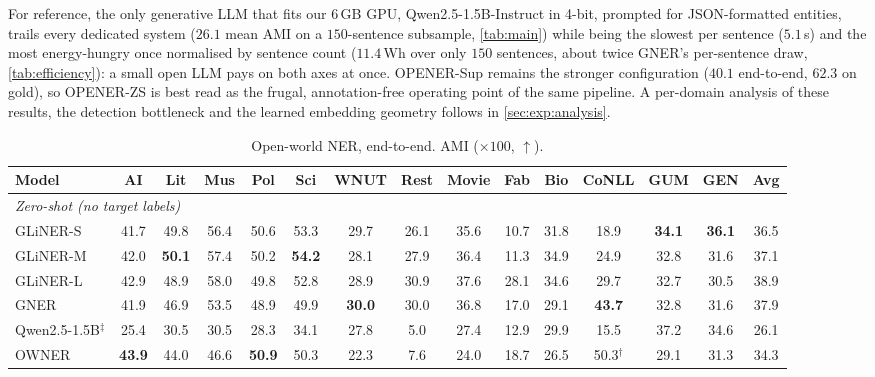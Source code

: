 For reference, the only generative LLM that fits our $6$\,GB GPU, Qwen2.5-1.5B-Instruct \cite{qwen2025} in 4-bit, prompted for JSON-formatted entities, trails every dedicated system ($26.1$ mean AMI on a $150$-sentence subsample, \autoref{tab:main}) while being the slowest per sentence ($5.1$\,s) and the most energy-hungry once normalised by sentence count ($11.4$\,Wh over only $150$ sentences, about twice GNER's per-sentence draw, \autoref{tab:efficiency}): a small open LLM pays on both axes at once.
OPENER-Sup remains the stronger configuration ($40.1$ end-to-end, $62.3$ on gold), so OPENER-ZS is best read as the frugal, annotation-free operating point of the same pipeline.
A per-domain analysis of these results, the detection bottleneck and the learned embedding geometry follows in \autoref{sec:exp:analysis}.

\begin{table}[tp]
\centering
\caption{Open-world NER, end-to-end. AMI ($\times 100$, $\uparrow$).}
\label{tab:main}
\scriptsize
\setlength{\tabcolsep}{2.5pt}
\begin{adjustbox}{max width=\textwidth}
\begin{threeparttable}
\begin{tabular}{l*{13}{c}c}
\toprule
Model & AI & Lit & Mus & Pol & Sci & WNUT & Rest & Movie & Fab & Bio & CoNLL & GUM & GEN & Avg \\
\midrule
\multicolumn{15}{l}{\emph{Zero-shot (no target labels)}} \\
GLiNER-S & 41.7 & 49.8 & 56.4 & 50.6 & 53.3 & 29.7 & 26.1 & 35.6 & 10.7 & 31.8 & 18.9 & \textbf{34.1} & \textbf{36.1} & 36.5 \\
GLiNER-M & 42.0 & \textbf{50.1} & 57.4 & 50.2 & \textbf{54.2} & 28.1 & 27.9 & 36.4 & 11.3 & 34.9 & 24.9 & 32.8 & 31.6 & 37.1 \\
GLiNER-L & 42.9 & 48.9 & 58.0 & 49.8 & 52.8 & 28.9 & 30.9 & 37.6 & 28.1 & 34.6 & 29.7 & 32.7 & 30.5 & 38.9 \\
GNER & 41.9 & 46.9 & 53.5 & 48.9 & 49.9 & \textbf{30.0} & 30.0 & 36.8 & 17.0 & 29.1 & \textbf{43.7} & 32.8 & 31.6 & 37.9 \\
Qwen2.5-1.5B$^\ddagger$ & 25.4 & 30.5 & 30.5 & 28.3 & 34.1 & 27.8 & 5.0 & 27.4 & 12.9 & 29.9 & 15.5 & 37.2 & 34.6 & 26.1 \\
OWNER & \textbf{43.9} & 44.0 & 46.6 & \textbf{50.9} & 50.3 & 22.3 & 7.6 & 24.0 & 18.7 & 26.5 & 50.3$^\dagger$ & 29.1 & 31.3 & 34.3 \\

\end{tabular}
\end{threeparttable}
\end{adjustbox}
\end{table}
